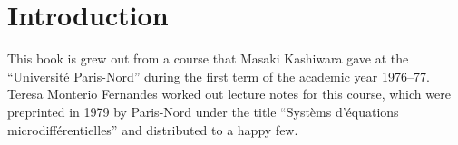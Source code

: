 \chapter{Introduction}

This book is grew out from a course that 
Masaki Kashiwara gave at the ``Universit\'e Paris-Nord'' 
during the first term of the academic year 1976--77. 
Teresa Monterio Fernandes worked out lecture notes for 
this course, which were preprinted in 1979 by Paris-Nord 
under the title ``Syst\`ems d'\'equations 
microdiff\'erentielles'' and distributed to a happy few.